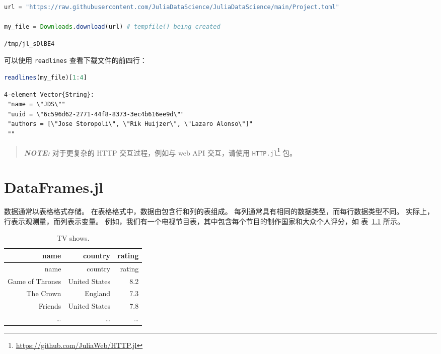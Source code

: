 \documentclass[
  notoc %
]{tufte-book}
\DeclareRobustCommand{\href}[2]{#2\footnote{\url{#1}}}
\newcommand{\passthrough}[1]{#1}
\begin{document}
\begin{lstlisting}[language=Julia]
url = "https://raw.githubusercontent.com/JuliaDataScience/JuliaDataScience/main/Project.toml"

my_file = Downloads.download(url) # tempfile() being created
\end{lstlisting}

\begin{lstlisting}[language=Output]
/tmp/jl_sDlBE4
\end{lstlisting}

可以使用 \passthrough{\lstinline!readlines!} 查看下载文件的前四行：

\begin{lstlisting}[language=Julia]
readlines(my_file)[1:4]
\end{lstlisting}

\begin{lstlisting}[language=Output]
4-element Vector{String}:
 "name = \"JDS\""
 "uuid = \"6c596d62-2771-44f8-8373-3ec4b616ee9d\""
 "authors = [\"Jose Storopoli\", \"Rik Huijzer\", \"Lazaro Alonso\"]"
 ""
\end{lstlisting}

\begin{quote}
\textbf{\emph{NOTE:}} 对于更复杂的 HTTP 交互过程，例如与 web API
交互，请使用
\href{https://github.com/JuliaWeb/HTTP.jl}{\passthrough{\lstinline!HTTP.jl!}}
包。
\end{quote}

\hypertarget{sec:dataframes}{%
\chapter{DataFrames.jl}\label{sec:dataframes}}

数据通常以表格格式存储。 在表格格式中，数据由包含行和列的表组成。
每列通常具有相同的数据类型，而每行数据类型不同。
实际上，行表示观测量，而列表示变量。
例如，我们有一个电视节目表，其中包含每个节目的制作国家和大众个人评分，如
表~\ref{tbl:TV_shows} 所示。

\hypertarget{tbl:TV_shows}{}
\begin{longtable}[]{@{}rrr@{}}
\caption{\label{tbl:TV_shows}TV shows.}\tabularnewline
\toprule
name & country & rating \\
\midrule
\endfirsthead
\toprule
name & country & rating \\
\midrule
\endhead
Game of Thrones & United States & 8.2 \\
The Crown & England & 7.3 \\
Friends & United States & 7.8 \\
\ldots{} & \ldots{} & \ldots{} \\
\bottomrule
\end{longtable}
\end{document}
